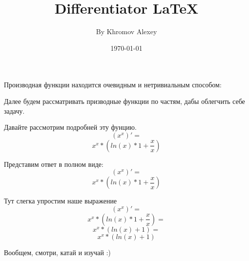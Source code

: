 \documentclass[a4paper,12pt]{article}
\author{By Khromov Alexey}
\title{Differentiator \LaTeX{}}
\date{\today}
\begin{document}
\maketitle
\newpage
Производная функции находится очевидным и нетривиальным способом:

Далее будем рассматривать призводные функции по частям, дабы облегчить себе задачу.

Давайте рассмотрим подробней эту фунцию.
\begin{equation}
\left( {x }^ {x }\right)' =
\end{equation}
\begin{equation}
{{x }^ {x }}* {\left( {{ln \left( {x }\right) }* {1 }}+ {\frac{{x }}{{x }}}\right) }
\end{equation}

Представим ответ в полном виде:
\begin{equation}
\left( {x }^ {x }\right)' =
\end{equation}
\begin{equation}
{{x }^ {x }}* {\left( {{ln \left( {x }\right) }* {1 }}+ {\frac{{x }}{{x }}}\right) }
\end{equation}

Тут слегка упростим наше выражение
\begin{equation}
\left( {x }^ {x }\right)' =
\end{equation}
\begin{equation}
{{x }^ {x }}* {\left( {{ln \left( {x }\right) }* {1 }}+ {\frac{{x }}{{x }}}\right) }=
\end{equation}
\begin{equation}
{{x }^ {x }}* {\left( {ln \left( {x }\right) }+ {1 }\right) }=
\end{equation}
\begin{equation}
{{x }^ {x }}* {\left( {ln \left( {x }\right) }+ {1 }\right) }
\end{equation}

Вообщем, смотри, катай и изучай :)
\end{document}

